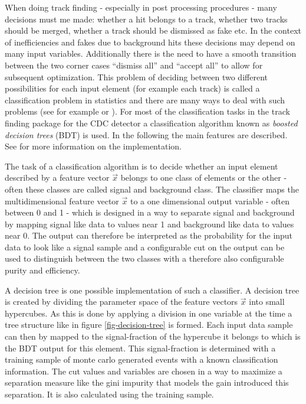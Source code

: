 When doing track finding - especially in post processing procedures - many decisions must me made: whether a hit belongs to a track, whether two tracks should be merged, whether a track should be dismissed as fake etc. In the context of inefficiencies and fakes due to background hits these decisions may depend on many input variables. Additionally there is the need to have a smooth transition between the two corner cases ``dismiss all'' and ``accept all'' to allow for subsequent optimization. This problem of deciding between two different possibilities for each input element (for example each track) is called a classification problem in statistics and there are many ways to deal with such problems (see for example \cite{cowan} or \cite{blobel}). For most of the classification tasks in the track finding package for the CDC detector a classification algorithm known as \emph{boosted decision trees} (BDT) is used. In the following the main features are described. See \cite{keck} for more information on the implementation.

The task of a classification algorithm is to decide whether an input element described by a feature vector $\vec x$ belongs to one class of elements or the other - often these classes are called signal and background class. The classifier maps the multidimensional feature vector $\vec x$ to a one dimensional output variable - often between 0 and 1 - which is designed in a way to separate signal and background by mapping signal like data to values near 1 and background like data to values near 0. The output can therefore be interpreted as the probability for the input data to look like a signal sample and a configurable cut on the output can be used to distinguish between the two classes with a therefore also configurable purity and efficiency.

A decision tree is one possible implementation of such a classifier. A decision tree is created by dividing the parameter space of the feature vectors $\vec x$ into small hypercubes. As this is done by applying a division in one variable at the time a tree structure like in figure \ref{fig-decision-tree} is formed. Each input data sample can then by mapped to the signal-fraction of the hypercube it belongs to which is the BDT output for this element. This signal-fraction is determined with a training sample of monte carlo generated events with a known classification information. The cut values and variables are chosen in a way to maximize a separation measure like the gini impurity that models the gain introduced this separation. It is also calculated using the training sample. 

